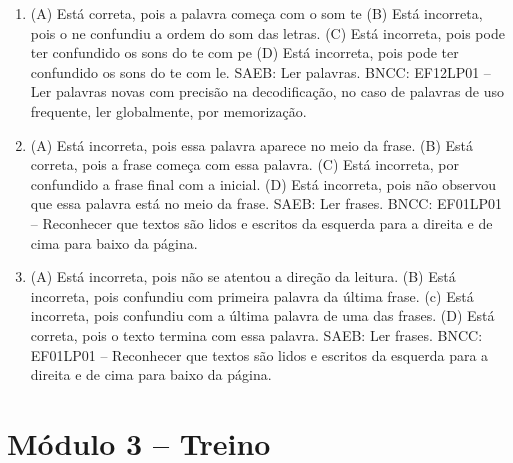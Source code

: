 \begin{enumerate}
\item
(A) Está correta, pois a palavra começa com o som te
(B) Está incorreta, pois o ne confundiu a ordem do som das letras.
(C) Está incorreta, pois pode ter confundido os sons do te com pe
(D) Está incorreta, pois pode ter confundido os sons do te com le.
SAEB: Ler palavras.
BNCC: EF12LP01 -- Ler palavras novas com precisão na decodificação, no caso
de palavras de uso frequente, ler globalmente, por memorização.

\item
(A) Está incorreta, pois essa palavra aparece no meio da frase.
(B) Está correta, pois a frase começa com essa palavra.
(C) Está incorreta, por confundido a frase final com a inicial.
(D) Está incorreta, pois não observou que essa palavra está no meio da frase.
SAEB: Ler frases.
BNCC: EF01LP01 -- Reconhecer que textos são lidos e escritos da esquerda
para a direita e de cima para baixo da página.

\item
(A) Está incorreta, pois não se atentou a direção da leitura.
(B) Está incorreta, pois confundiu com primeira palavra da última frase.
(c) Está incorreta, pois confundiu com a última palavra de uma das frases.
(D) Está correta, pois o texto termina com essa palavra.
SAEB: Ler frases.
BNCC: EF01LP01 -- Reconhecer que textos são lidos e escritos da esquerda
para a direita e de cima para baixo da página.
\end{enumerate}

\section*{Módulo 3 – Treino}

